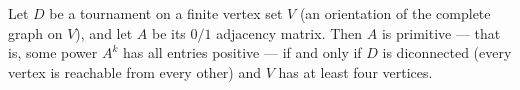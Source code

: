 \begin{theorem}
\label{tournament_adjMatrix_isPrimitive_iff}
\leanok
{}
Let $D$ be a tournament on a finite vertex set $V$ (an orientation of the complete graph
on $V$), and let $A$ be its $0/1$ adjacency matrix. Then $A$ is primitive — that is,
some power $A^{k}$ has all entries positive — if and only if $D$ is diconnected (every
vertex is reachable from every other) and $V$ has at least four vertices.
\end{theorem}

